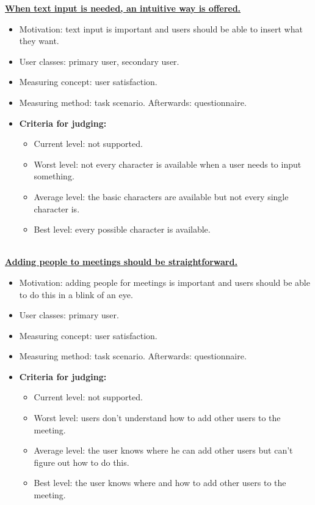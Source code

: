 \documentclass[11pt, a4paper,svglistings]{report}
\begin{document}
\textbf{\underline{When text input is needed, an intuitive way is offered.}}
\begin{itemize}
\item{Motivation: text input is important and users should be able to insert what they want.}
\item{User classes: primary user, secondary user.}
\item{Measuring concept: user satisfaction.}
\item{Measuring method: task scenario. Afterwards: questionnaire.}
\item{\textbf{Criteria for judging:}}
\begin{itemize}
\item{Current level: not supported.}
\item{Worst level: not every character is available when a user needs to input something.}
\item{Average level: the basic characters are available but not every single character is.}
\item{Best level: every possible character is available. \\ \\}
\end{itemize}
\end{itemize}
\textbf{\underline{Adding people to meetings should be straightforward.}}
\begin{itemize}
\item{Motivation: adding people for meetings is important and users should be able to do this in a blink of an eye.}
\item{User classes: primary user.}
\item{Measuring concept: user satisfaction.}
\item{Measuring method: task scenario. Afterwards: questionnaire.}
\item{\textbf{Criteria for judging:}}
\begin{itemize}
\item{Current level: not supported.}
\item{Worst level: users don't understand how to add other users to the meeting.}
\item{Average level: the user knows where he can add other users but can't figure out how to do this.}
\item{Best level: the user knows where and how to add other users to the meeting. \\ \\}
\end{itemize}
\end{itemize}
\end{document}
